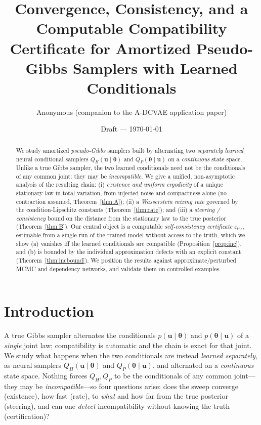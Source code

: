 \documentclass[11pt]{article}
\title{\textbf{Convergence, Consistency, and a Computable Compatibility\\
Certificate for Amortized Pseudo-Gibbs Samplers with Learned Conditionals}}
\author{Anonymous (companion to the A-DCVAE application paper)}
\date{Draft --- \today}
\theoremstyle{plain}
\theoremstyle{definition}
\theoremstyle{remark}
\newcommand{\bth}{\bm{\theta}}
\newcommand{\bu}{\bm{u}}
\newcommand{\einc}{\varepsilon_{\mathrm{inc}}}
\begin{document}
\maketitle

\begin{abstract}
We study amortized \emph{pseudo-Gibbs} samplers built by alternating two \emph{separately learned}
neural conditional samplers $Q_H(\bu\mid\bth)$ and $Q_P(\bth\mid\bu)$ on a \emph{continuous} state
space. Unlike a true Gibbs sampler, the two learned conditionals need not be the conditionals of any
common joint: they may be \emph{incompatible}. We give a unified, non-asymptotic analysis of the
resulting chain: (i) \emph{existence and uniform ergodicity} of a unique stationary law in total
variation, from injected noise and compactness alone (no contraction assumed, Theorem~\ref{thm:A});
(ii) a \emph{Wasserstein mixing rate} governed by the condition-Lipschitz constants
(Theorem~\ref{thm:rate}); and (iii) a \emph{steering / consistency} bound on the distance from the
stationary law to the true posterior (Theorem~\ref{thm:B}). Our central object is a computable
\emph{self-consistency certificate} $\einc$, estimable from a single run of the trained model without
access to the truth, which we show (a) vanishes iff the learned conditionals are compatible
(Proposition~\ref{prop:inc}), and (b) is bounded by the individual approximation defects with an
explicit constant (Theorem~\ref{thm:incbound}). We position the results against approximate/perturbed
MCMC and dependency networks, and validate them on controlled examples.
\end{abstract}

\tableofcontents

\section{Introduction}
\label{sec:intro}

A true Gibbs sampler alternates the conditionals $p(\bu\mid\bth)$ and $p(\bth\mid\bu)$ of a
\emph{single} joint law; compatibility is automatic and the chain is exact for that joint. We study
what happens when the two conditionals are instead \emph{learned separately}, as neural samplers
$Q_H(\bu\mid\bth)$ and $Q_P(\bth\mid\bu)$, and alternated on a \emph{continuous} state space. Nothing
forces $Q_H,Q_P$ to be the conditionals of any common joint---they may be \emph{incompatible}---so
four questions arise: does the sweep converge (existence), how fast (rate), to \emph{what} and how far
from the true posterior (steering), and can one \emph{detect} incompatibility without knowing the
truth (certification)?
\end{document}
